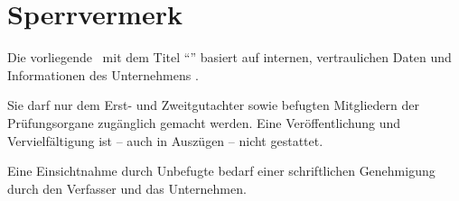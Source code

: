 
\chapter*{Sperrvermerk}
\thispagestyle{empty}
Die vorliegende \myworktype ~mit dem Titel \enquote{\emph{{\mytitle}}} basiert auf internen, vertraulichen Daten und Informationen des Unternehmens \mydualpartner.

Sie darf nur dem Erst- und Zweitgutachter sowie befugten Mitgliedern der Prüfungsorgane zugänglich gemacht werden. Eine Veröffentlichung und Vervielfältigung ist -- auch in Auszügen -- nicht gestattet.

Eine Einsichtnahme durch Unbefugte bedarf einer schriftlichen Genehmigung durch den Verfasser und das Unternehmen.

\newpage